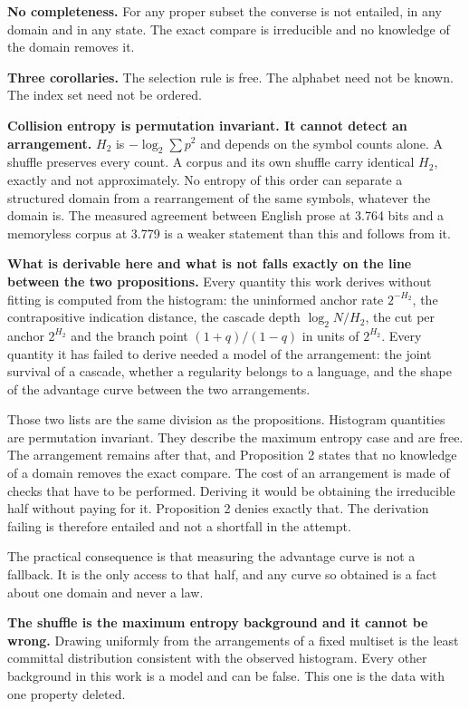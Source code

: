 \textbf{No completeness.} For any proper subset the converse is not entailed, in any domain and in any state. The exact compare is irreducible and no knowledge of the domain removes it.

\textbf{Three corollaries.} The selection rule is free. The alphabet need not be known. The index set need not be ordered.

\textbf{Collision entropy is permutation invariant. It cannot detect an arrangement.} \(H_2\) is \(-\log_2 \sum p^2\) and depends on the symbol counts alone. A shuffle preserves every count. A corpus and its own shuffle carry identical \(H_2\), exactly and not approximately. No entropy of this order can separate a structured domain from a rearrangement of the same symbols, whatever the domain is. The measured agreement between English prose at 3.764 bits and a memoryless corpus at 3.779 is a weaker statement than this and follows from it.

\textbf{What is derivable here and what is not falls exactly on the line between the two propositions.} Every quantity this work derives without fitting is computed from the histogram: the uninformed anchor rate \(2^{-H_2}\), the contrapositive indication distance, the cascade depth \(\log_2 N / H_2\), the cut per anchor \(2^{H_2}\) and the branch point \((1+q)/(1-q)\) in units of \(2^{H_2}\). Every quantity it has failed to derive needed a model of the arrangement: the joint survival of a cascade, whether a regularity belongs to a language, and the shape of the advantage curve between the two arrangements.

Those two lists are the same division as the propositions. Histogram quantities are permutation invariant. They describe the maximum entropy case and are free. The arrangement remains after that, and Proposition 2 states that no knowledge of a domain removes the exact compare. The cost of an arrangement is made of checks that have to be performed. Deriving it would be obtaining the irreducible half without paying for it. Proposition 2 denies exactly that. The derivation failing is therefore entailed and not a shortfall in the attempt.

The practical consequence is that measuring the advantage curve is not a fallback. It is the only access to that half, and any curve so obtained is a fact about one domain and never a law.

\textbf{The shuffle is the maximum entropy background and it cannot be wrong.} Drawing uniformly from the arrangements of a fixed multiset is the least committal distribution consistent with the observed histogram. Every other background in this work is a model and can be false. This one is the data with one property deleted.

